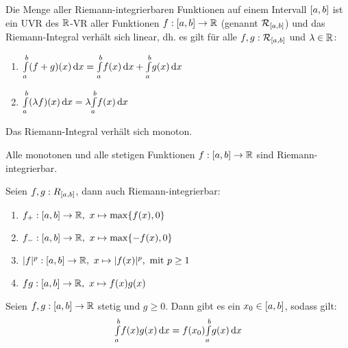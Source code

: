 \documentclass{cheat-sheet}
\begin{document}
\begin{satz}
Die Menge aller Riemann-integrierbaren Funktionen auf einem Intervall $\left[ a, b \right]$ ist ein UVR des $\mathbb{R}$-VR aller Funktionen $f : \left[ a, b \right] \to \mathbb{R}$ (genannt $\mathcal{R}_{\left[ a, b \right]}$) und das Riemann-Integral verhält sich linear, dh. es gilt für alle $f, g : \mathcal{R}_{\left[ a, b \right]}$ und $\lambda \in \mathbb{R}$:

\begin{enumerate}
  \item ${\textstyle \int\limits_{a}^{b}} (f + g)(x) \,\mathrm{d} x = {\textstyle \int\limits_{a}^{b}} f(x) \,\mathrm{d} x + {\textstyle \int\limits_{a}^{b}} g(x) \,\mathrm{d} x$
  \item ${\textstyle \int\limits_{a}^{b}} (\lambda f)(x) \,\mathrm{d} x = \lambda {\textstyle \int\limits_{a}^{b}} f(x) \,\mathrm{d} x$
\end{enumerate}
\end{satz}

\begin{satz}
Das Riemann-Integral verhält sich monoton.
\end{satz}


\begin{satz}
Alle monotonen und alle stetigen Funktionen $f : \left[ a, b \right] \to \mathbb{R}$ sind Riemann-integrierbar.
\end{satz}

\begin{satz}
Seien $f, g : R_{\left[ a, b \right]}$, dann auch Riemann-integrierbar:

\begin{enumerate}
  \item $f_{+} : \left[ a, b \right] \to \mathbb{R},\ x \mapsto \max\{f(x), 0\}$
  \item $f_{-} : \left[ a, b \right] \to \mathbb{R},\ x \mapsto \max\{-f(x), 0\}$
  \item $\lvert f\rvert^{p} : \left[ a, b \right] \to \mathbb{R},\ x \mapsto \lvert f(x)\rvert^p, \text{ mit } p \ge 1$
  \item $fg : \left[ a, b \right] \to \mathbb{R},\ x \mapsto f(x)g(x)$
\end{enumerate}
\end{satz}

\begin{satz}
  Seien $f, g : \left[ a, b \right] \to \mathbb{R}$ stetig und $g \ge 0$. Dann gibt es ein $x_0 \in \left[ a, b \right]$, sodass gilt:
  \[ {\textstyle \int\limits_{a}^{b}} f(x)g(x) \,\mathrm{d} x = f(x_0) {\textstyle \int\limits_{a}^{b}} g(x) \,\mathrm{d} x \]
\end{satz}
\end{document}
